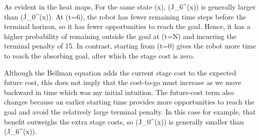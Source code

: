 As evident in the heat maps, For the same state (x), (J\_6\textasciicircum{}(x)) is generally larger than (J\_0\textasciicircum{}(x)). At (t=6), the robot has fewer remaining time steps before the terminal horizon, so it has fewer opportunities to reach the goal. Hence, it has a higher probability of remaining outside the goal at (t=N) and incurring the terminal penalty of 15. In contrast, starting from (t=0) gives the robot more time to reach the absorbing goal, after which the stage cost is zero.

Although the Bellman equation adds the current stage cost to the expected future cost, this does not imply that the cost-to-go must increase as we move backward in time which was my initial intuition. The future-cost term also changes because an earlier starting time provides more opportunities to reach the goal and avoid the relatively large terminal penalty. In this case for example, that benefit outweighs the extra stage costs, so (J\_0\textasciicircum{}(x)) is generally smaller than (J\_6\textasciicircum{}(x)).
